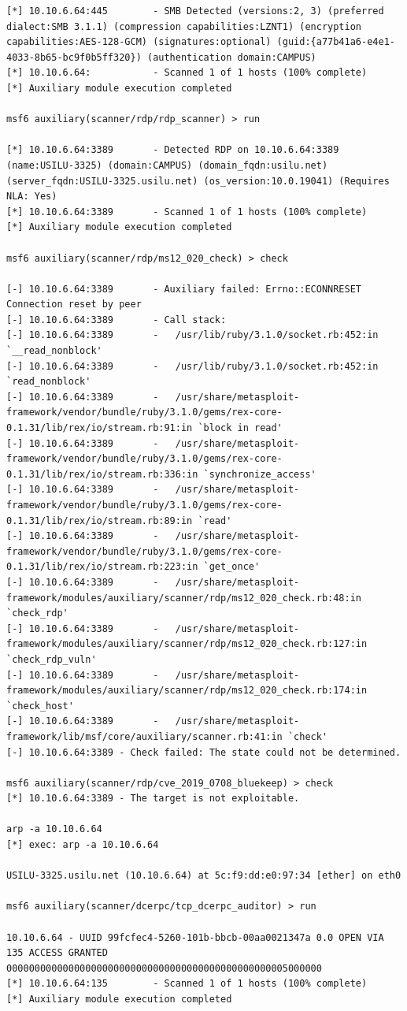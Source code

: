 \documentclass[mscthesis]{usiinfthesis}
\begin{document}
\begin{lstlisting}[language={},frame=single,breaklines=true,postbreak=\mbox{\textcolor{red}{$\hookrightarrow$}\space}]
[*] 10.10.6.64:445        - SMB Detected (versions:2, 3) (preferred dialect:SMB 3.1.1) (compression capabilities:LZNT1) (encryption capabilities:AES-128-GCM) (signatures:optional) (guid:{a77b41a6-e4e1-4033-8b65-bc9f0b5ff320}) (authentication domain:CAMPUS)
[*] 10.10.6.64:           - Scanned 1 of 1 hosts (100% complete)
[*] Auxiliary module execution completed

msf6 auxiliary(scanner/rdp/rdp_scanner) > run

[*] 10.10.6.64:3389       - Detected RDP on 10.10.6.64:3389       (name:USILU-3325) (domain:CAMPUS) (domain_fqdn:usilu.net) (server_fqdn:USILU-3325.usilu.net) (os_version:10.0.19041) (Requires NLA: Yes)
[*] 10.10.6.64:3389       - Scanned 1 of 1 hosts (100% complete)
[*] Auxiliary module execution completed

msf6 auxiliary(scanner/rdp/ms12_020_check) > check

[-] 10.10.6.64:3389       - Auxiliary failed: Errno::ECONNRESET Connection reset by peer
[-] 10.10.6.64:3389       - Call stack:
[-] 10.10.6.64:3389       -   /usr/lib/ruby/3.1.0/socket.rb:452:in `__read_nonblock'
[-] 10.10.6.64:3389       -   /usr/lib/ruby/3.1.0/socket.rb:452:in `read_nonblock'
[-] 10.10.6.64:3389       -   /usr/share/metasploit-framework/vendor/bundle/ruby/3.1.0/gems/rex-core-0.1.31/lib/rex/io/stream.rb:91:in `block in read'
[-] 10.10.6.64:3389       -   /usr/share/metasploit-framework/vendor/bundle/ruby/3.1.0/gems/rex-core-0.1.31/lib/rex/io/stream.rb:336:in `synchronize_access'
[-] 10.10.6.64:3389       -   /usr/share/metasploit-framework/vendor/bundle/ruby/3.1.0/gems/rex-core-0.1.31/lib/rex/io/stream.rb:89:in `read'
[-] 10.10.6.64:3389       -   /usr/share/metasploit-framework/vendor/bundle/ruby/3.1.0/gems/rex-core-0.1.31/lib/rex/io/stream.rb:223:in `get_once'
[-] 10.10.6.64:3389       -   /usr/share/metasploit-framework/modules/auxiliary/scanner/rdp/ms12_020_check.rb:48:in `check_rdp'
[-] 10.10.6.64:3389       -   /usr/share/metasploit-framework/modules/auxiliary/scanner/rdp/ms12_020_check.rb:127:in `check_rdp_vuln'
[-] 10.10.6.64:3389       -   /usr/share/metasploit-framework/modules/auxiliary/scanner/rdp/ms12_020_check.rb:174:in `check_host'
[-] 10.10.6.64:3389       -   /usr/share/metasploit-framework/lib/msf/core/auxiliary/scanner.rb:41:in `check'
[-] 10.10.6.64:3389 - Check failed: The state could not be determined.

msf6 auxiliary(scanner/rdp/cve_2019_0708_bluekeep) > check
[*] 10.10.6.64:3389 - The target is not exploitable.

arp -a 10.10.6.64
[*] exec: arp -a 10.10.6.64

USILU-3325.usilu.net (10.10.6.64) at 5c:f9:dd:e0:97:34 [ether] on eth0

msf6 auxiliary(scanner/dcerpc/tcp_dcerpc_auditor) > run

10.10.6.64 - UUID 99fcfec4-5260-101b-bbcb-00aa0021347a 0.0 OPEN VIA 135 ACCESS GRANTED 00000000000000000000000000000000000000000000000005000000
[*] 10.10.6.64:135        - Scanned 1 of 1 hosts (100% complete)
[*] Auxiliary module execution completed
\end{lstlisting}
\end{document}
